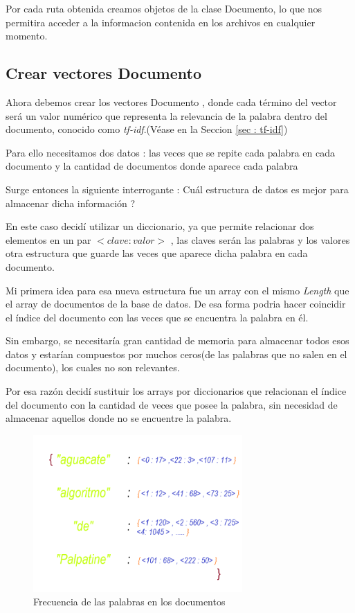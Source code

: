 \documentclass{article}
\begin{document}
Por cada ruta obtenida creamos objetos de la clase Documento, lo que nos permitira acceder a la informacion contenida en los archivos en cualquier momento.

\subsection{Crear vectores Documento} \label{sec : vd}

Ahora debemos crear los vectores Documento , donde cada término del vector será un valor numérico que representa la relevancia
de la palabra dentro del documento, conocido como \textit{tf-idf}.(Véase en la Seccion \ref{sec : tf-idf})

Para ello necesitamos dos datos : las veces que se repite cada palabra en cada documento y la cantidad de documentos donde aparece cada palabra

Surge entonces la siguiente interrogante : Cuál estructura de datos es mejor para almacenar dicha información ?

En este caso decidí utilizar un diccionario, ya que permite relacionar dos elementos en un par $<clave : valor>$ , las claves serán las palabras y
los valores otra estructura que guarde las veces que aparece dicha palabra en cada documento.

Mi primera idea para esa nueva estructura fue un array con el mismo \textit{Length} que el array de documentos de la base de datos.
De esa forma podria hacer coincidir el índice del documento con las veces que se encuentra la palabra en él.

Sin embargo, se necesitaría gran cantidad de memoria para almacenar todos esos datos y estarían compuestos por muchos 
ceros(de las palabras que no salen en el documento), los cuales no son relevantes.

Por esa razón decidí sustituir los arrays por diccionarios que relacionan el índice del documento con la cantidad de veces que posee la palabra,
sin necesidad de almacenar aquellos donde no se encuentre la palabra.

\begin{center}
    
\begin{figure}[ht]
    \label{fig : content}
    \includegraphics[width = 8cm]{./../images/content.png}
    \caption{Frecuencia de las palabras en los documentos}
\end{figure}

\end{center}
\end{document}
